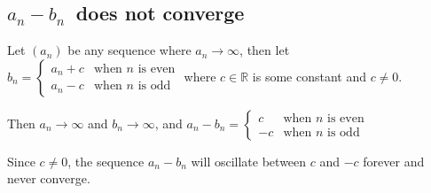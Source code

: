 \documentclass[a4paper]{article}
\begin{document}
\subsection{$a_n - b_n$\normalfont\ does not converge}

Let $(a_n)$ be any sequence where $a_n \to \infty$, then let $b_n = \begin{cases}
	a_n + c &\text{when } n \text{ is even}\\[1ex]
	a_n - c &\text{when } n \text{ is odd}
\end{cases}$ where $c \in \mathbb R$ is some constant and $c \ne 0$.

Then $a_n \to \infty$ and $b_n \to \infty$, and $a_n - b_n = \begin{cases}
	c  &\text{when } n \text{ is even}\\[1ex]
	-c &\text{when } n \text{ is odd}
\end{cases}$

Since $c \ne 0$, the sequence $a_n - b_n$ will oscillate between $c$ and $-c$ forever and never converge.
\end{document}
